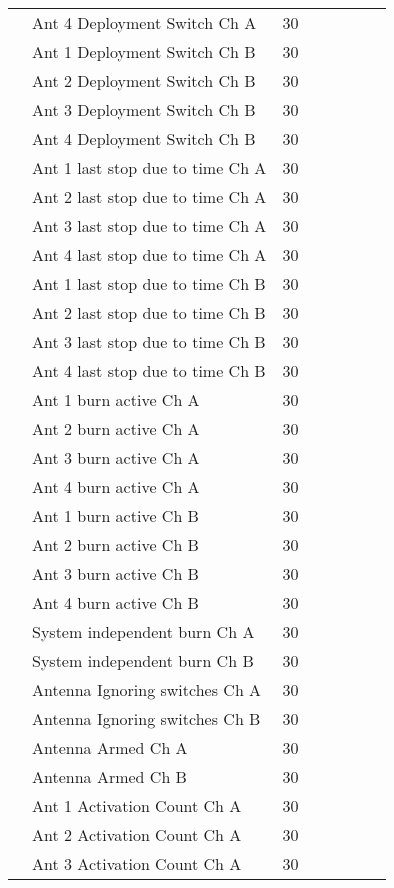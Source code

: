 \begin{longtable}{c|m{5cm}|M{1.5cm}|ccccc}
    & Ant 4 Deployment Switch Ch A & 30 \\
    & Ant 1 Deployment Switch Ch B & 30 \\
    & Ant 2 Deployment Switch Ch B & 30 \\
    & Ant 3 Deployment Switch Ch B & 30 \\
    & Ant 4 Deployment Switch Ch B & 30 \\
    & Ant 1 last stop due to time Ch A & 30 \\
    & Ant 2 last stop due to time Ch A & 30 \\
    & Ant 3 last stop due to time Ch A & 30 \\
    & Ant 4 last stop due to time Ch A & 30 \\
    & Ant 1 last stop due to time Ch B & 30 \\
    & Ant 2 last stop due to time Ch B & 30 \\
    & Ant 3 last stop due to time Ch B & 30 \\
    & Ant 4 last stop due to time Ch B & 30 \\
    & Ant 1 burn active Ch A & 30 \\
    & Ant 2 burn active Ch A & 30 \\
    & Ant 3 burn active Ch A & 30 \\
    & Ant 4 burn active Ch A & 30 \\
    & Ant 1 burn active Ch B & 30 \\
    & Ant 2 burn active Ch B & 30 \\
    & Ant 3 burn active Ch B & 30 \\
    & Ant 4 burn active Ch B & 30 \\ 
    & System independent burn Ch A & 30 \\
    & System independent burn Ch B & 30 \\
    & Antenna Ignoring switches Ch A & 30 \\
    & Antenna Ignoring switches Ch B & 30 \\
    & Antenna Armed Ch A & 30 \\
    & Antenna Armed Ch B & 30 \\
    & Ant 1 Activation Count Ch A & 30 \\
    & Ant 2 Activation Count Ch A & 30 \\
    & Ant 3 Activation Count Ch A & 30 \\

\end{longtable}
